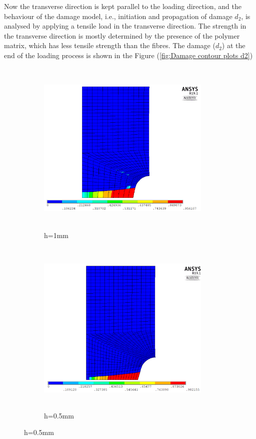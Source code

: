 \documentclass[a4paper,12pt,twoside]{report}
\begin{document}
\FloatBarrier
Now the transverse direction is kept parallel to the loading direction, and the behaviour of the damage model, i.e., initiation and propagation of damage $d_{2}$, is analysed by applying a tensile load in the transverse direction. The strength in the transverse direction is mostly determined by the presence of the polymer matrix, which has less tensile strength than the fibres. The damage ($d_{2}$) at the end of the loading process is shown in the Figure (\ref{fig:Damage contour plots d2})
\\
\begin{figure}[htbp!]
     \captionsetup[subfigure]{justification=centering}
     \begin{subfigure}{0.4\textwidth}
         \includegraphics[width=8.3cm,height=8.5cm,keepaspectratio]{25.d2-1.png}
         \caption{h=1mm}
         \label{fig:d2-1}
     \end{subfigure}
     \hspace{1.8cm}
     \begin{subfigure}{0.4\textwidth}
         \includegraphics[width=8.3cm,height=8.5cm,keepaspectratio]{25.d2-0.5.png}
         \caption{h=0.5mm}
         \label{fig:d2-0.5}
     \end{subfigure}
\end{figure}
\end{document}

